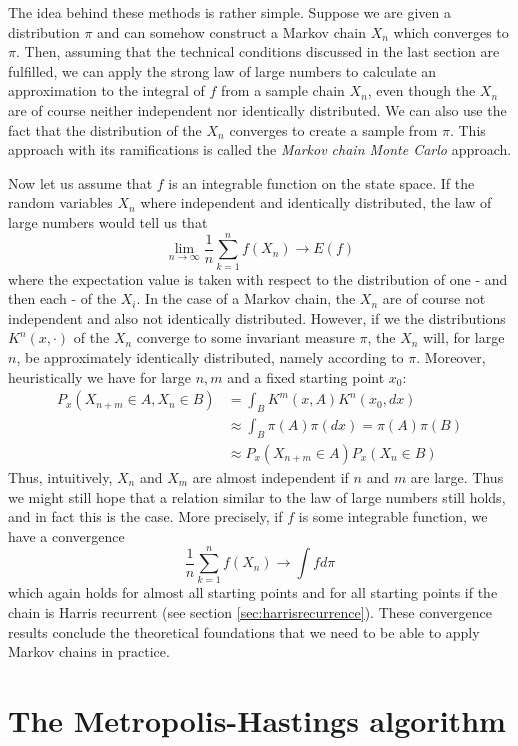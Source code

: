 \documentclass[a4paper, draft]{article}
\theoremstyle{own}
\theoremstyle{remark}
\begin{document}
The idea behind these methods is rather simple. Suppose we are given a distribution $\pi$ and can somehow construct a Markov chain $X_n$ which converges to $\pi$. Then, assuming that the technical conditions discussed in the last section are fulfilled, we can apply the strong law of large numbers to calculate an approximation to the integral of $f$ from a sample chain $X_n$, even though the $X_n$ are of course neither independent nor identically distributed. We can also use the fact that the distribution of the $X_n$ converges to create a sample from $\pi$. This approach with its ramifications is called the {\em Markov chain Monte Carlo} approach.

Now let us assume that $f$ is an integrable function on the state space. If the random variables $X_n$ where independent and identically distributed, the law of large numbers would tell us that 
$$
\lim_{n \rightarrow \infty} \frac{1}{n} \sum_{k=1}^n f(X_n) \rightarrow E(f)
$$
where the expectation value is taken with respect to the distribution of one - and then each - of the $X_i$. In the case of a Markov chain, the $X_n$ are of course not independent and also not identically distributed. However, if we the distributions $K^n(x,\cdot)$ of the $X_n$ converge to some invariant measure $\pi$, the $X_n$ will, for large $n$, be approximately identically distributed, namely according to $\pi$. Moreover, heuristically we have for large $n, m$ and a fixed starting point $x_0$:
\begin{align*}
P_x(X_{n+m} \in A, X_n \in B) &= \int_B K^m(x,A) K^n(x_0, dx) \\
& \approx \int_B \pi(A) \pi(dx)  
= \pi(A) \pi(B) \\
&\approx P_x(X_{n+m} \in A) P_x(X_n \in B)
\end{align*}
Thus, intuitively, $X_n$ and $X_m$ are almost independent if $n$ and $m$ are large. Thus we might still hope that a relation similar to the law of large numbers still holds, and in fact this is the case. More precisely, if $f$ is some integrable function, we have a convergence
$$
\frac{1}{n} \sum_{k=1}^n f(X_n) \rightarrow \int f d\pi
$$
which again holds for almost all starting points and for all starting points if the chain is Harris recurrent (see section \ref{sec:harrisrecurrence}). These convergence results conclude the theoretical foundations that we need to be able to apply Markov chains in practice.

\section{The Metropolis-Hastings algorithm}
\end{document}
